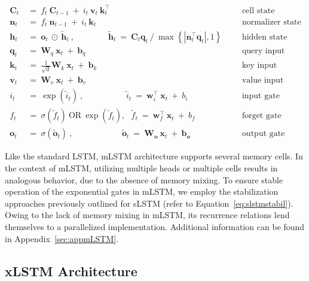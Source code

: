 \begin{align}
\label{eq:mlstm_recurrent_begin}
\mathbf{C}_t \ &= \  f_t \ \mathbf{C}_{t-1} \ + \ 
  i_t \ \mathbf{v}_t \ \mathbf{k}_t^\top & &  &\text{cell state} \\
\mathbf{n}_t \ &= \  f_t \ \mathbf{n}_{t-1} \ + \ 
  i_t \ \mathbf{k}_t & &  &\text{normalizer state} \\
\mathbf{h}_t  \ &= \ \mathbf{o}_t \ \odot \ \tilde{\mathbf{h}}_t
\ , \qquad \qquad 
\tilde{\mathbf{h}}_t \ = \   \mathbf{C}_t \mathbf{q}_t \ / \ 
  \max \left\{ |\mathbf{n}_t^\top \mathbf{q}_t|, 1 \right\} 
   &&&\text{hidden state} \\
\mathbf{q}_t \ &= \ \mathbf{W}_q \ \mathbf{x}_t \ + \ \mathbf{b}_q  & &  &\text{query input} \\
\mathbf{k}_t \ &= \ \frac{1}{\sqrt{d}} \mathbf{W}_k \ \mathbf{x}_t \ + \ \mathbf{b}_k  & &  &\text{key input} \\
\mathbf{v}_t \ &= \ \mathbf{W}_v \ \mathbf{x}_t \ + \ \mathbf{b}_v  & &  &\text{value input} \\
i_t \ &= \ \!\exp \!  \! \left( \tilde{i}_t  \right) \ , 
 \qquad \qquad \ \ \ \ \,
  \tilde{i}_t \ = \ \mathbf{w}^\top_{i} \ \mathbf{x}_t \ + \  b_{i} \ \ \ 
  &&&\text{input gate} \\
f_t \ &= \ \sigma \!  \left(  \tilde{f}_t \right) \ \text{OR} \ \!\exp \!  \! \left(  \tilde{f}_t \right) , \ \ \: \!
\tilde{f}_t \ = \ \mathbf{w}^\top_{f} \ \mathbf{x}_t  \ + \
  b_{f}
  &&& \text{forget gate} \\
\label{eq:mlstm_recurrent_end}
\mathbf{o}_t \ &= \ \sigma \left( \tilde{\mathbf{o}}_t \right) \ , \qquad \qquad \quad \ \ \ \,
  \tilde{\mathbf{o}}_t  \ = \ \mathbf{W}_{\mathbf{o}} \ \mathbf{x}_t \ + \
  \mathbf{b}_{\mathbf{o}}
  &&&\text{output gate} 
\end{align}

Like the standard LSTM, mLSTM architecture supports several memory cells. In the context of mLSTM, utilizing multiple heads or multiple cells results in analogous behavior, due to the absence of memory mixing. To ensure stable operation of the exponential gates in mLSTM, we employ the stabilization approaches previously outlined for sLSTM (refer to Equation~\ref{eq:slstmstabil}). Owing to the lack of memory mixing in mLSTM, its recurrence relations lend themselves to a parallelized implementation. Additional information can be found in Appendix~\ref{sec:appmLSTM}.

\subsection{xLSTM Architecture}
\label{sec:xLSTMarch}

